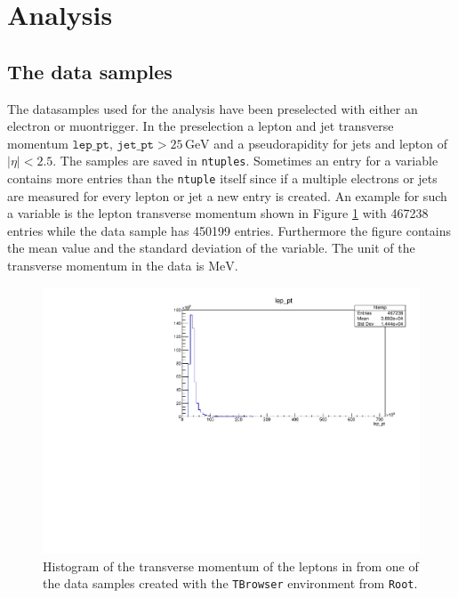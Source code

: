 \section{Analysis}\label{sec:analysis}

\subsection{The data samples}
The datasamples used for the analysis have been preselected with either an electron or muontrigger. In the preselection a lepton and jet transverse momentum 
$\texttt{lep\_pt}, \, \texttt{jet\_pt} > 25 \, \si{\giga\eV}$ and a pseudorapidity for jets and lepton of $|\eta| <2.5$. 
The samples are saved in \texttt{ntuples}. Sometimes an entry for a variable contains more entries than the \texttt{ntuple} itself since if a multiple 
electrons or jets are measured for every lepton or jet a new entry is created. An example for such a variable is the lepton transverse momentum 
shown in Figure \ref{fig:unselected_pt} with 467238 entries while the data sample has 450199 entries.  
Furthermore the figure contains the mean value and the standard deviation of the variable. The unit of the transverse momentum in the data is $\si{\mega\eV}$.

\begin{figure}[tb]
    \centering
    \includegraphics[width=.9\textwidth]{plots/TBrowser_hist.pdf}
    \caption{Histogram of the transverse momentum of the leptons in from one of the data samples created with the \texttt{TBrowser} environment from \texttt{Root}.}
    \label{fig:unselected_pt}
  \end{figure}

